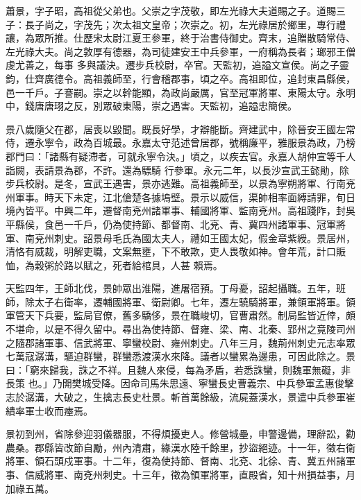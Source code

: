 
\begin{pinyinscope}

 蕭景，字子昭，高祖從父弟也。父崇之字茂敬，即左光祿大夫道賜之子。道賜三子：長子尚之，字茂先；次太祖文皇帝；次崇之。初，左光祿居於鄉里，專行禮讓，為眾所推。仕歷宋太尉江夏王參軍，終于治書侍御史。齊末，追贈散騎常侍、左光祿大夫。尚之敦厚有德器，為司徒建安王中兵參軍，一府稱為長者；瑯邪王僧虔尤善之，每事
 多與議決。遷步兵校尉，卒官。天監初，追謚文宣侯。尚之子靈鈞，仕齊廣德令。高祖義師至，行會稽郡事，頃之卒。高祖即位，追封東昌縣侯，邑一千戶。子謇嗣。崇之以幹能顯，為政尚嚴厲，官至冠軍將軍、東陽太守。永明中，錢唐唐珝之反，別眾破東陽，崇之遇害。天監初，追謚忠簡侯。



 景八歲隨父在郡，居喪以毀聞。既長好學，才辯能斷。齊建武中，除晉安王國左常侍，遷永寧令，政為百城最。永嘉太守范述曾居郡，號稱廉平，雅服景為政，乃榜郡門曰：「諸縣有疑滯者，可就永寧令決。」頃之，以疾去官。永嘉人胡仲宣等千人詣闕，表請景為郡，不許。還為驃騎
 行參軍。永元二年，以長沙宣武王懿勛，除步兵校尉。是冬，宣武王遇害，景亦逃難。高祖義師至，以景為寧朔將軍、行南兗州軍事。時天下未定，江北傖楚各據塢壁。景示以威信，渠帥相率面縛請罪，旬日境內皆平。中興二年，遷督南兗州諸軍事、輔國將軍、監南兗州。高祖踐阼，封吳平縣侯，食邑一千戶，仍為使持節、都督南、北兗、青、冀四州諸軍事、冠軍將軍、南兗州刺史。詔景母毛氏為國太夫人，禮如王國太妃，假金章紫綬。景居州，清恪有威裁，明解吏職，文案無壅，下不敢欺，吏人畏敬如神。會年荒，計口賑恤，為穀粥於路以賦之，死者給棺具，人甚
 賴焉。



 天監四年，王師北伐，景帥眾出淮陽，進屠宿預。丁母憂，詔起攝職。五年，班師，除太子右衛率，遷輔國將軍、衛尉卿。七年，遷左驍騎將軍，兼領軍將軍。領軍管天下兵要，監局官僚，舊多驕侈，景在職峻切，官曹肅然。制局監皆近倖，頗不堪命，以是不得久留中。尋出為使持節、督雍、梁、南、北秦、郢州之竟陵司州之隨郡諸軍事、信武將軍、寧蠻校尉、雍州刺史。八年三月，魏荊州刺史元志率眾七萬寇潺溝，驅迫群蠻，群蠻悉渡漢水來降。議者以蠻累為邊患，可因此除之。景曰：「窮來歸我，誅之不祥。且魏人來侵，每為矛盾，若悉誅蠻，則魏軍無礙，非長策
 也。」乃開樊城受降。因命司馬朱思遠、寧蠻長史曹義宗、中兵參軍孟惠俊擊志於潺溝，大破之，生擒志長史杜景。斬首萬餘級，流屍蓋漢水，景遣中兵參軍崔繢率軍士收而瘞焉。



 景初到州，省除參迎羽儀器服，不得煩擾吏人。修營城壘，申警邊備，理辭訟，勸農桑。郡縣皆改節自勵，州內清肅，緣漢水陸千餘里，抄盜絕迹。十一年，徵右衛將軍、領石頭戍軍事。十二年，復為使持節、督南、北兗、北徐、青、冀五州諸軍事、信威將軍、南兗州刺史。十三年，徵為領軍將軍，直殿省，知十州損益事，月加祿五萬。




\end{pinyinscope}
